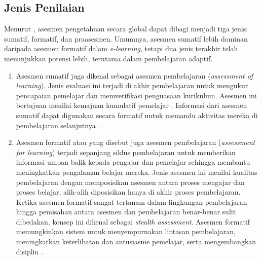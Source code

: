 \subsection{Jenis Penilaian}
Menurut \textcite{Ihichr2024}, asesmen pengetahuan secara global dapat dibagi menjadi
tiga jenis: sumatif, formatif, dan praasesmen. Umumnya, asesmen sumatif lebih
dominan daripada asesmen formatif dalam \textit{e-learning}, tetapi dua jenis
terakhir telah menunjukkan potensi lebih, terutama dalam pembelajaran adaptif.


\begin{enumerate}
    \item Asesmen sumatif juga dikenal sebagai asesmen pembelajaran (\textit{assessment of
    learning}). Jenis evaluasi ini terjadi di akhir pembelajaran untuk mengukur
    pencapaian pemelajar dan memverifikasi penguasaan kurikulum. Asesmen ini
    bertujuan menilai kemajuan kumulatif pemelajar \autocite{Ihichr2024}. Informasi
    dari asesmen sumatif dapat digunakan secara formatif untuk memandu aktivitas
    mereka di pembelajaran selanjutnya \autocite{Minn2022}.

    \item Asesmen formatif atau yang disebut juga asesmen pembelajaran \linebreak
    (\textit{assessment for learning}) terjadi sepanjang siklus pembelajaran
    untuk memberikan informasi umpan balik kepada pengajar dan pemelajar sehingga membantu
    meningkatkan pengalaman belajar mereka. Jenis asesmen ini menilai kualitas
    pembelajaran dengan memposisikan asesmen antara proses mengajar dan proses belajar, alih-alih diposisikan hanya di akhir proses pembelajaran. Ketika asesmen
    formatif sangat tertanam dalam lingkungan pembelajaran hingga pemisahan antara
    asesmen dan pembelajaran benar-benar sulit dibedakan, konsep
    ini dikenal sebagai \textit{stealth assessment}. Asesmen formatif memungkinkan sistem
    untuk menyempurnakan lintasan pembelajaran, meningkatkan keterlibatan dan antusiasme
    pemelajar, serta mengembangkan disiplin \autocite{Ihichr2024}.
    

\end{enumerate}
